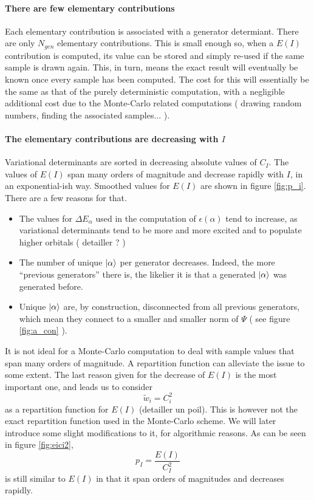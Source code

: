 \paragraph{There are few elementary contributions}
Each elementary contribution is associated with a generator determiant. There are only $N_{gen}$ elementary contributions. This is small enough so, when a $E(I)$ contribution is computed, its value can be stored and simply re-used if the same sample is drawn again. This, in turn, means the exact result will eventually be known once every sample has been computed. The cost for this will essentially be the same as that of the purely deterministic computation, with a negligible additional cost due to the Monte-Carlo related computations ( drawing random numbers, finding the associated samples... ).

\paragraph{The elementary contributions are decreasing with $I$}
	Variational determinants are sorted in decreasing absolute values of $C_I$.
	The values of $E(I)$ span many orders of magnitude and decrease rapidly with $I$, in an exponential-ish way. Smoothed values for $E(I)$ are shown in figure \ref{fig:p_i}. There are a few reasons for that.
\begin{itemize}
	\item
	The values for $\Delta E_\alpha$ used in the computation of $\epsilon(\alpha)$ tend to increase, as variational determinants tend to be more and more excited and to populate higher orbitals ( detailler ? )
	\item
	The number of unique $| \alpha \rangle$ per generator decreases. Indeed, the more ``previous generators'' there is, the likelier it is that a generated $| \alpha \rangle$ was generated before.
	\item
	Unique $| \alpha \rangle$ are, by construction, disconnected from all previous generators, which mean they connect to a smaller and smaller norm of $\Psi$ ( see figure \ref{fig:a_con} ). 
\end{itemize}
It is not ideal for a Monte-Carlo computation to deal with sample values that span many orders of magnitude. A repartition function can alleviate the issue to some extent.
The last reason given for the decrease of $E(I)$ is the most important one, and leads us to consider
$$\tilde w_i = C_i^2$$
as a repartition function for $E(I)$ (detailler un poil). This is however not the exact repartition function used in the Monte-Carlo scheme. We will later introduce some slight modifications to it, for algorithmic reasons. As can be seen in figure \ref{fig:eici2}, $$p_I = \frac{E(I)}{C_I^2}$$ is  still similar to $E(I)$ in that it span orders of magnitudes and decreases rapidly.
